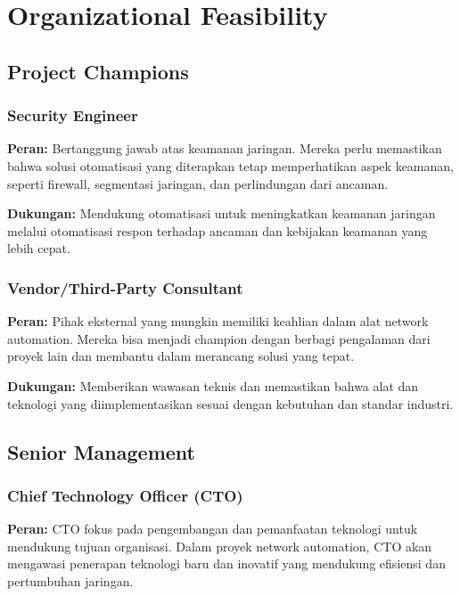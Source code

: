 \section{Organizational Feasibility}

\subsection{Project Champions}

\subsubsection{Security Engineer}

\textbf{Peran:} Bertanggung jawab atas keamanan jaringan. Mereka perlu memastikan bahwa solusi otomatisasi yang diterapkan tetap memperhatikan aspek keamanan, seperti firewall, segmentasi jaringan, dan perlindungan dari ancaman.

\textbf{Dukungan:} Mendukung otomatisasi untuk meningkatkan keamanan jaringan melalui otomatisasi respon terhadap ancaman dan kebijakan keamanan yang lebih cepat.

\subsubsection{Vendor/Third-Party Consultant}

\textbf{Peran:} Pihak eksternal yang mungkin memiliki keahlian dalam alat network automation. Mereka bisa menjadi champion dengan berbagi pengalaman dari proyek lain dan membantu dalam merancang solusi yang tepat.

\textbf{Dukungan:} Memberikan wawasan teknis dan memastikan bahwa alat dan teknologi yang diimplementasikan sesuai dengan kebutuhan dan standar industri.

\subsection{Senior Management}

\subsubsection{Chief Technology Officer (CTO)}

\textbf{Peran:} CTO fokus pada pengembangan dan pemanfaatan teknologi untuk mendukung tujuan organisasi. Dalam proyek network automation, CTO akan mengawasi penerapan teknologi baru dan inovatif yang mendukung efisiensi dan pertumbuhan jaringan.

